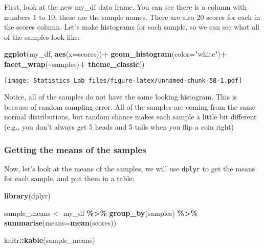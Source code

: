 \documentclass[
]{book}
\newenvironment{Shaded}{\begin{snugshade}}{\end{snugshade}}
\newcommand{\AttributeTok}[1]{\textcolor[rgb]{0.13,0.29,0.53}{#1}}
\newcommand{\FunctionTok}[1]{\textcolor[rgb]{0.13,0.29,0.53}{\textbf{#1}}}
\newcommand{\NormalTok}[1]{#1}
\newcommand{\OtherTok}[1]{\textcolor[rgb]{0.56,0.35,0.01}{#1}}
\newcommand{\SpecialCharTok}[1]{\textcolor[rgb]{0.81,0.36,0.00}{\textbf{#1}}}
\newcommand{\StringTok}[1]{\textcolor[rgb]{0.31,0.60,0.02}{#1}}
\begin{document}
First, look at the new my\_df data frame. You can see there is a column
with numbers 1 to 10, these are the sample names. There are also 20
scores for each in the scores column. Let's make histograms for each
sample, so we can see what all of the samples look like:

\begin{Shaded}
\begin{Highlighting}[]
\FunctionTok{ggplot}\NormalTok{(my\_df, }\FunctionTok{aes}\NormalTok{(}\AttributeTok{x=}\NormalTok{scores))}\SpecialCharTok{+}
  \FunctionTok{geom\_histogram}\NormalTok{(}\AttributeTok{color=}\StringTok{"white"}\NormalTok{)}\SpecialCharTok{+}
  \FunctionTok{facet\_wrap}\NormalTok{(}\SpecialCharTok{\textasciitilde{}}\NormalTok{samples)}\SpecialCharTok{+}
  \FunctionTok{theme\_classic}\NormalTok{()}
\end{Highlighting}
\end{Shaded}

\texttt{[image: Statistics\_Lab\_files/figure-latex/unnamed-chunk-58-1.pdf]}

Notice, all of the samples do not have the same looking histogram. This
is because of random sampling error. All of the samples are coming from
the same normal distributions, but random chance makes each sample a
little bit different (e.g., you don't always get 5 heads and 5 tails
when you flip a coin right)

\hypertarget{getting-the-means-of-the-samples}{%
\subsubsection{Getting the means of the samples}\label{getting-the-means-of-the-samples}}

Now, let's look at the means of the samples, we will use \texttt{dplyr} to get
the means for each sample, and put them in a table:

\begin{Shaded}
\begin{Highlighting}[]
\FunctionTok{library}\NormalTok{(dplyr)}

\NormalTok{sample\_means }\OtherTok{\textless{}{-}}\NormalTok{ my\_df }\SpecialCharTok{\%\textgreater{}\%}
                \FunctionTok{group\_by}\NormalTok{(samples) }\SpecialCharTok{\%\textgreater{}\%}
                \FunctionTok{summarise}\NormalTok{(}\AttributeTok{means=}\FunctionTok{mean}\NormalTok{(scores))}

\NormalTok{knitr}\SpecialCharTok{::}\FunctionTok{kable}\NormalTok{(sample\_means)}
\end{Highlighting}
\end{Shaded}
\end{document}
